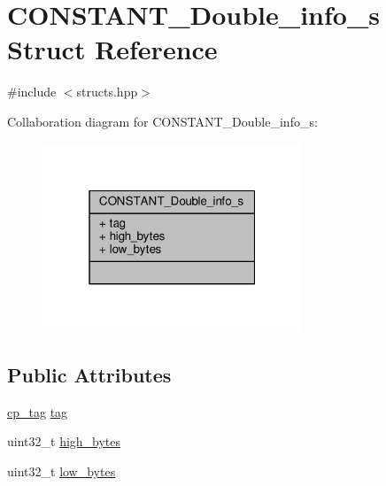 \hypertarget{structCONSTANT__Double__info__s}{\section{C\+O\+N\+S\+T\+A\+N\+T\+\_\+\+Double\+\_\+info\+\_\+s Struct Reference}
\label{structCONSTANT__Double__info__s}
}


{\ttfamily \#include $<$structs.\+hpp$>$}



Collaboration diagram for C\+O\+N\+S\+T\+A\+N\+T\+\_\+\+Double\+\_\+info\+\_\+s\+:\nopagebreak
\begin{figure}[H]
\begin{center}
\leavevmode
\includegraphics[width=220pt]{structCONSTANT__Double__info__s__coll__graph}
\end{center}
\end{figure}
\subsection*{Public Attributes}
\begin{DoxyCompactItemize}
\item 
\hyperlink{structs_8hpp_a17947ec3f3c1f2392eabd36c1ba5fec6}{cp\+\_\+tag} \hyperlink{structCONSTANT__Double__info__s_ac95905e32467bd7084ab69661f85dc83}{tag}
\item 
uint32\+\_\+t \hyperlink{structCONSTANT__Double__info__s_ac924312805777fa64c8f353464cc84fe}{high\+\_\+bytes}
\item 
uint32\+\_\+t \hyperlink{structCONSTANT__Double__info__s_ab4ea9f49f1751d71959cc7075c414cf3}{low\+\_\+bytes}
\end{DoxyCompactItemize}


